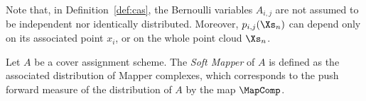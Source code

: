 
Note that, in Definition~\ref{def:cas}, the Bernoulli variables $A_{i,j}$ are not assumed to be independent nor identically distributed. 
Moreover, $p_{i,j}(\Xs_n)$ can depend only on its associated point $x_i$, or on the whole point cloud $\Xs_n$.

\begin{definition}
Let $A$ be a cover assignment scheme. 
The \emph{Soft Mapper} of $A$ is defined as the associated 
distribution of Mapper complexes, which corresponds to the push forward measure of the distribution of $A$ by the map $\MapComp$. %
\end{definition}




